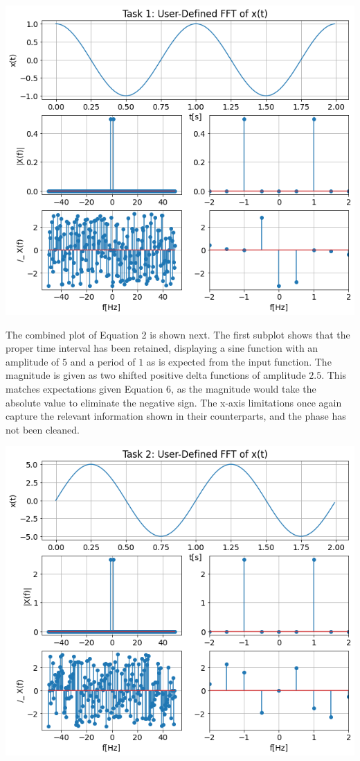 \documentclass[12pt]{report}
\begin{document}
\begin{center}
	\includegraphics[scale = 0.38]{Lab 9 - Plots/Task1.png}\\[1.0 cm]
\end{center}

The combined plot of Equation 2 is shown next. The first subplot shows that the proper time interval has been retained, displaying a sine function with an amplitude of $ 5 $ and a period of $ 1 $ as is expected from the input function. The magnitude is given as two shifted positive delta functions of amplitude $ 2.5 $. This matches expectations given Equation 6, as the magnitude would take the absolute value to eliminate the negative sign. The x-axis limitations once again capture the relevant information shown in their counterparts, and the phase has not been cleaned. \\

\begin{center}
	\includegraphics[scale = 0.38]{Lab 9 - Plots/Task2.png}\\[1.0 cm]
\end{center}
\end{document}

